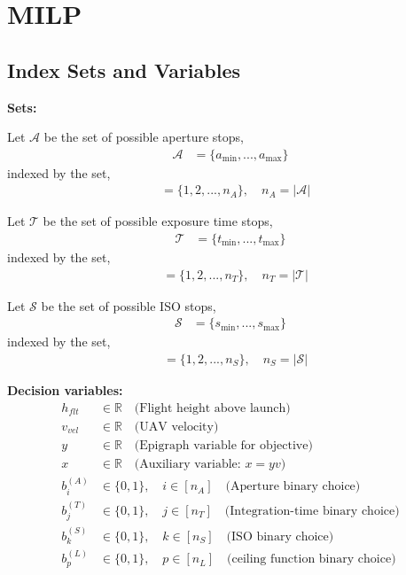 \documentclass[11pt]{article}
\begin{document}
\section{MILP}

\subsection{Index Sets and Variables}

\textbf{Sets:}

Let $\mathcal{A}$ be the set of possible aperture stops,
\begin{align}
  \mathcal{A} &= \{a_{\min}, ... ,a_{\max}\}
\end{align}
indexed by the set,
\begin{align}
  [n_A] &= \{1,2,...,n_A\}, \quad n_A = |\mathcal{A}|
\end{align}

Let $\mathcal{T}$ be the set of possible exposure time stops,
\begin{align}
  \mathcal{T} &= \{t_{\min}, ... ,t_{\max}\}
\end{align}
indexed by the set,
\begin{align}
  [n_T] &= \{1,2,...,n_T\}, \quad n_T = |\mathcal{T}|
\end{align}

Let $\mathcal{S}$ be the set of possible ISO stops,
\begin{align}
  \mathcal{S} &= \{s_{\min}, ... ,s_{\max}\}
\end{align}
indexed by the set,
\begin{align}
  [n_S] &= \{1,2,...,n_S\}, \quad n_S = |\mathcal{S}|
\end{align}

\textbf{Decision variables:}
\begin{align}
  h_{flt} &\in \mathbb{R} \quad \text{(Flight height above launch)}\\
  v_{vel} &\in \mathbb{R} \quad \text{(UAV velocity)}\\
  y &\in \mathbb{R} \quad \text{(Epigraph variable for objective)}\\
  x &\in \mathbb{R} \quad \text{(Auxiliary variable: }x = yv\text{)}\\
  b_{i}^{(A)} &\in \{0,1\}, \quad i \in [n_A] \quad \text{(Aperture binary choice)}\\
  b_{j}^{(T)} &\in \{0,1\}, \quad j \in [n_T] \quad \text{(Integration-time binary choice)}\\
  b_{k}^{(S)} &\in \{0,1\}, \quad k \in [n_S] \quad \text{(ISO binary choice)}\\
  b_{p}^{(L)} &\in \{0,1\}, \quad p \in [n_L] \quad \text{(ceiling function binary choice)}
\end{align}
\end{document}
